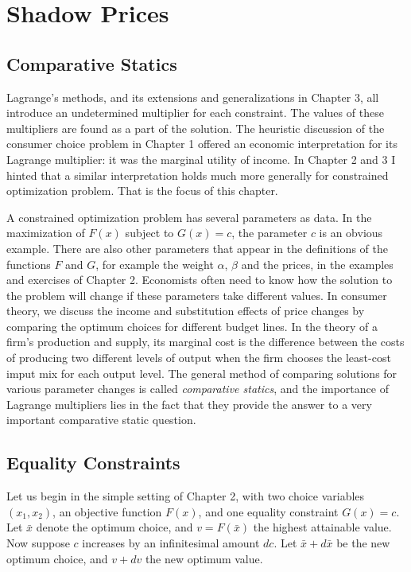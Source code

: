\chapter{Shadow Prices}

\section*{Comparative Statics}

Lagrange's methods, and its extensions and generalizations in Chapter 3, all introduce an undetermined multiplier for each constraint. The values of these multipliers are found as a part of the solution. The heuristic discussion of the consumer choice problem in Chapter 1 offered an economic interpretation for its Lagrange multiplier: it was the marginal utility of income. In Chapter 2 and 3 I hinted that a similar interpretation holds much more generally for constrained optimization problem. That is the focus of this chapter.

A constrained optimization problem has several parameters as data. In the maximization of $F(x)$ subject to $G(x)=c$, the parameter $c$ is an obvious example. There are also other parameters that appear in the definitions of the functions $F$ and $G$, for example the weight $\alpha$, $\beta$ and the prices, in the examples and exercises of Chapter 2. Economists often need to know how the solution to the problem will change if these parameters take different values. In consumer theory, we discuss the income and substitution effects of price changes by comparing the optimum choices for different budget lines. In the theory of a firm's production and supply, its marginal cost is the difference between the costs of producing two different levels of output when the firm chooses the least-cost imput mix for each output level. The general method of comparing solutions for various parameter changes is called \textit{comparative statics}, and the importance of Lagrange multipliers lies in the fact that they provide the answer to a very important comparative static question.

\section*{Equality Constraints}

Let us begin in the simple setting of Chapter 2, with two choice variables $(x_1, x_2)$, an objective function $F(x)$, and one equality constraint $G(x)=c$. Let $\bar{x}$ denote the optimum choice, and $v=F(\bar{x})$ the highest attainable value. Now suppose $c$ increases by an infinitesimal amount $dc$. Let $\bar{x}+ d\bar{x}$ be the new optimum choice, and $v+dv$ the new optimum value.

